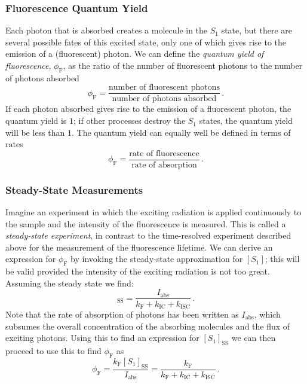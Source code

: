 \documentclass{article}
\theoremstyle{plain}\theoremheaderfont{\normalfont\itshape}\theorembodyfont{\rmfamily}\theoremseparator{.}\newtheorem*{rem}{Remark}\newtheorem*{ex}{Example}\newtheorem*{proof}{Proof}\newtheorem*{altp}{Alternative proof}
\theoremstyle{plain}\theoremheaderfont{\normalfont\bfseries}\theorembodyfont{\rmfamily}\theoremseparator{.}\newtheorem{thm}{Theorem}[section]\newtheorem{lem}[thm]{Lemma}\newtheorem{prop}[thm]{Proposition}\newtheorem*{cor}{Corollary}\newtheorem{defn}[thm]{Definition}\newtheorem{clm}[thm]{Claim}\newtheorem{clminproof}{Claim}\newtheorem{pos}{Postulate}[section]
\theoremstyle{break}\theoremheaderfont{\normalfont\itshape}\theorembodyfont{\rmfamily}\theoremseparator{.\medskip}\newtheorem*{proofskip}{Proof}\newtheorem*{exs}{Examples}\newtheorem*{rems}{Remarks}
\theoremstyle{break}\theoremheaderfont{\normalfont\bfseries}\theorembodyfont{\rmfamily}\theoremseparator{.\medskip}\newtheorem{lemskip}[thm]{Lemma}\newtheorem{defnskip}[thm]{Definition}\newtheorem{propskip}[thm]{Proposition}\newtheorem{thmskip}[thm]{Theorem}
\numberwithin{equation}{section}
\newcommand{\FF}{_{\text{F}}}
\newcommand{\IC}{_{\text{IC}}}
\newcommand{\ISC}{_{\text{ISC}}}
\begin{document}
    \subsubsection*{Fluorescence Quantum Yield}
    Each photon that is absorbed creates a molecule in the \(S_1\) state, but there are several possible fates of this excited state, only one of which gives rise to the emission of a (fluorescent) photon. We can define the \textit{quantum yield of fluorescence}, \(\phi\FF\), as the ratio of the number of fluorescent photons to the number of photons absorbed
    \begin{equation}
        \phi\FF=\frac{\text{number of fluorescent photons}}{\text{number of photons absorbed}}\,.
    \end{equation}
    If each photon absorbed gives rise to the emission of a fluorescent photon, the quantum yield is \(1\); if other processes destroy the \(S_1\) states, the quantum yield will be less than \(1\). The quantum yield can equally well be defined in terms of rates
    \begin{equation}
        \phi\FF=\frac{\text{rate of fluorescence}}{\text{rate of absorption}}\,.
    \end{equation}
    \subsubsection*{Steady-State Measurements}
    Imagine an experiment in which the exciting radiation is applied continuously to the sample and the intensity of the fluorescence is measured.  This is called a \textit{steady-state experiment}, in contrast to the time-resolved experiment described above for the measurement of the fluorescence lifetime. We can derive an expression for \(\phi\FF\) by invoking the steady-state approximation for \([S_1]\); this will be valid provided the intensity of the exciting radiation is not too great. Assuming the steady state we find:
    \begin{equation}
        [S_1]_{\text{SS}}=\frac{I_{\text{abs}}}{k\FF+k\IC+k\ISC}\,.
    \end{equation}
    Note that the rate of absorption of photons has been written as \(I_{\text{abs}}\), which subsumes the overall concentration of the absorbing molecules and the flux of exciting photons. Using this to find an expression for \([S_1]_{\text{SS}}\) we can then proceed to use this to find \(\phi\FF\) as
    \begin{equation}\label{ss_exp_yield}
        \phi\FF=\frac{k\FF[S_1]_{\text{SS}}}{I_{\text{abs}}}=\frac{k\FF}{k\FF+k\IC+k\ISC}\,.
    \end{equation}
\end{document}
